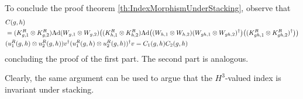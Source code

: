 \documentclass[11pt,a4paper,twoside]{article}
\numberwithin{equation}{section}
\begin{document}
	To conclude the proof theorem \ref{th:IndexMorphismUnderStacking}, observe that
	\begin{align}
		&C(g,h)\\
		\nonumber
		&=(K_{g,1}^R\otimes K_{g,2}^R)\Ad{W_{g,1}\otimes W_{g,2}}\left((K_{h,1}^R\otimes K_{h,2}^R)\Ad{(W_{h,1}\otimes W_{h,2})(W_{gh,1}\otimes W_{gh,2})^\dagger}\left((K_{gh,1}^R\otimes K_{gh,2}^R)^\dagger\right)\right)\\
		&(u^R_1(g,h)\otimes u^R_2(g,h))v^\dagger (u^R_1(g,h)\otimes u^R_2(g,h))^\dagger v=C_1(g,h)C_2(g,h)
	\end{align}
	concluding the proof of the first part. The second part is analogous.
	\begin{remark}\label{rem:StackingH3ValuedIndex}
		Clearly, the same argument can be used to argue that the $H^3$-valued index is invariant under stacking.
	\end{remark}
\end{document}
